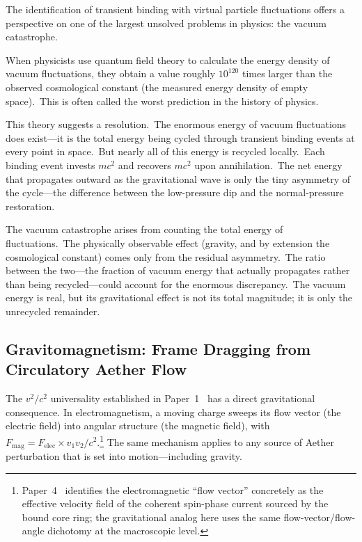 ﻿\documentclass[12pt,letterpaper]{article}
\begin{document}
The identification of transient binding with virtual particle fluctuations offers a
perspective on one of the largest unsolved problems in physics: the vacuum catastrophe.

When physicists use quantum field theory to calculate the energy density of vacuum
fluctuations, they obtain a value roughly $10^{120}$ times larger than the observed
cosmological constant (the measured energy density of empty space).\ This is often called
the worst prediction in the history of physics.

This theory suggests a resolution.\ The enormous energy of vacuum fluctuations does exist---it is the total energy being cycled through transient binding events at every point in
space.\ But nearly all of this energy is recycled locally.\ Each binding event invests $mc^2$
and recovers $mc^2$ upon annihilation.\ The net energy that propagates outward as the
gravitational wave is only the tiny asymmetry of the cycle---the difference between the
low-pressure dip and the normal-pressure restoration.

The vacuum catastrophe arises from counting the total energy of fluctuations.\ The
physically observable effect (gravity, and by extension the cosmological constant) comes
only from the residual asymmetry.\ The ratio between the two---the fraction of vacuum
energy that actually propagates rather than being recycled---could account for the
enormous discrepancy.\ The vacuum energy is real, but its gravitational effect is not its
total magnitude; it is only the unrecycled remainder.




\subsection{Gravitomagnetism: Frame Dragging from Circulatory Aether Flow}
\label{sec:gravitomagnetism}

The $v^2/c^2$ universality established in Paper~1~\cite{otto-overview} has a direct
gravitational consequence.  In electromagnetism, a moving charge sweeps its flow vector
(the electric field) into angular structure (the magnetic field), with
$F_{\mathrm{mag}} = F_{\mathrm{elec}} \times v_1 v_2 / c^2$.\footnote{Paper~4~\cite{otto-em}
identifies the electromagnetic ``flow vector'' concretely as the effective
velocity field of the coherent spin-phase current sourced by the bound core
ring; the gravitational analog here uses
the same flow-vector/flow-angle dichotomy at the macroscopic level.}
The same mechanism applies to any source of Aether perturbation that is set into
motion---including gravity.
\end{document}

